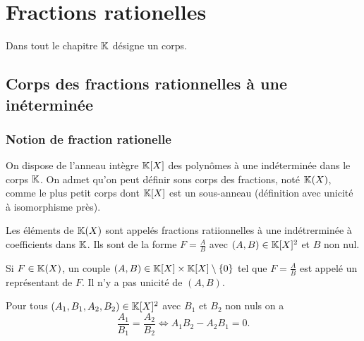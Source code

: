 \chapter{Fractions rationelles}
\label{chap:fractionrationnelles}
\minitoc
\minilof
\minilot

Dans tout le chapitre \(\mathbb{K}\) désigne un corps.

\section{Corps des fractions rationnelles à une inéterminée}

\subsection{Notion de fraction rationelle}

On dispose de l'anneau intègre \(\mathbb{K}[X]\) des polynômes à une indéterminée dans le corps \(\mathbb{K}\). On admet qu'on peut définir sons corps des fractions, noté \(\mathbb{K}(X)\), comme le plus petit corps dont \(\mathbb{K}[X]\) est un sous-anneau (définition avec unicité à isomorphisme près).

Les éléments de \(\mathbb{K}(X)\) sont appelés fractions ratiionnelles à une indétrerminée à coefficients dans \(\mathbb{K}\). Ils sont de la forme \(F=\frac{A}{B}\) avec \((A,B) \in \mathbb{K}[X]^2\) et \(B\) non nul.

Si \(F \in \mathbb{K}(X)\), un couple  \((A,B) \in \mathbb{K}[X]\times \mathbb{K}[X]\setminus\{0\}\) tel que \(F=\frac{A}{B}\) est appelé un représentant de \(F\). Il n'y a pas unicité de \((A,B)\).

Pour tous \((A_1,B_1,A_2,B_2) \in \mathbb{K}[X]^2\) avec \(B_1\) et \(B_2\) non nuls on a
\begin{equation}
  \frac{A_1}{B_1} = \frac{A_2}{B_2}   \iff A_1B_2 -A_2B_1 =0.
\end{equation}

